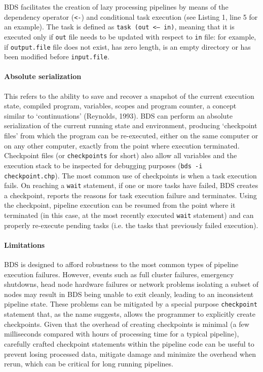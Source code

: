 BDS facilitates the creation of lazy processing pipelines by means of the dependency operator (\texttt{<-}) and conditional task execution (see Listing 1, line 5 for an example). The task is defined as \texttt{task (out <– in)}, meaning that it is executed only if \texttt{out} file needs to be updated with respect to \texttt{in} file: for example, if \texttt{output.file} file does not exist, has zero length, is an empty directory or has been modified before \texttt{input.file}.

\paragraph{Absolute serialization} This refers to the ability to save and recover a snapshot of the current execution state, compiled program, variables, scopes and program counter, a concept similar to ‘continuations’ (Reynolds, 1993). BDS can perform an absolute serialization of the current running state and environment, producing ‘checkpoint files’ from which the program can be re-executed, either on the same computer or on any other computer, exactly from the point where execution terminated. Checkpoint files (or \texttt{checkpoints} for short) also allow all variables and the execution stack to be inspected for debugging purposes (\texttt{bds -i checkpoint.chp}). The most common use of checkpoints is when a task execution fails. On reaching a \texttt{wait} statement, if one or more tasks have failed, BDS creates a checkpoint, reports the reasons for task execution failure and terminates. Using the checkpoint, pipeline execution can be resumed from the point where it terminated (in this case, at the most recently executed \texttt{wait} statement) and can properly re-execute pending tasks (i.e. the tasks that previously failed execution).

\paragraph{Limitations} BDS is designed to afford robustness to the most common types of pipeline execution failures. However, events such as full cluster failures, emergency shutdowns, head node hardware failures or network problems isolating a subset of nodes may result in BDS being unable to exit cleanly, leading to an inconsistent pipeline state. These problems can be mitigated by a special purpose \texttt{checkpoint} statement that, as the name suggests, allows the programmer to explicitly create checkpoints. Given that the overhead of creating checkpoints is minimal (a few milliseconds compared with hours of processing time for a typical pipeline), carefully crafted checkpoint statements within the pipeline code can be useful to prevent losing processed data, mitigate damage and minimize the overhead when rerun, which can be critical for long running pipelines.

